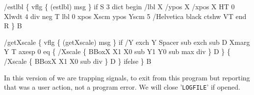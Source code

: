 \documentclass[11pt]{article}
\def\nwendcode{\endtrivlist \endgroup} %
\let\nwdocspar=\par                    %
\begin{document}
/estlbl \{  %
  vflg \{ (estlbl) msg \} if  %
  S  %
    3 dict begin  %
      /lbl X  %
      /ypos X  %
      /xpos X  %
      HT  %
      0 Xlwdt 4 div neg T  %
      lbl 0  %
      xpos Xscm  %
      ypos Yscm  %
      5 /Helvetica  %
      black  %
      ctshw  %
      VT  %
    end  %
  R  %
\} B  %
\eatline
{}\nwendcode{}\nwdocspar
\nwenddocs{}\endmoddef
/getXscale \{  %
  vflg \{ (getXscale) msg \} if  %
  /Y  %
    exch  %
    Y  %
    Spacer sub  %
    exch  %
    sub  %
  D  %
  Xmarg Y T  %
  axesp 0 eq \{  %
    /Xscale \{  %
      BBoxX  %
      X1 X0 sub  %
      Y1 Y0 sub  %
      max  %
      div  %
    \} D  %
  \} \{  %
    /Xscale \{  %
      BBoxX  %
      X1 X0 sub  %
      div  %
    \} D  %
  \} ifelse  %
\} B  %
\eatline
{}\nwendcode{}\nwdocspar

\newpage



In this version of {\prog} we are trapping signals, to exit from this program but reporting that was a user action, not a program error. We will close '{\tt{}LOGFILE}' if opened. 
\end{document}

